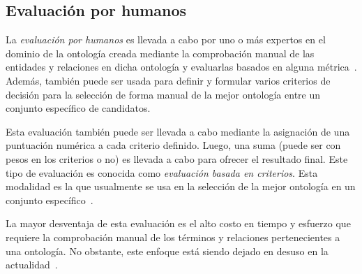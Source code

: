\subsection{Evaluación por humanos}
La \textit{evaluación por humanos} es llevada a cabo por uno o más expertos en el dominio de la ontología creada mediante la comprobación manual de las entidades y relaciones en dicha ontología y evaluarlas basados en alguna métrica~\cite{ref:97}. Además, también puede ser usada para definir y formular varios criterios de decisión para la selección de forma manual de la mejor ontología entre un conjunto específico de candidatos.

Esta evaluación también puede ser llevada a cabo mediante la asignación de una puntuación numérica a cada criterio definido. Luego, una suma (puede ser con pesos en los criterios o no) es llevada a cabo para ofrecer el resultado final. Este tipo de evaluación es conocida como \textit{evaluación basada en criterios}\cite{ref:96}. Esta modalidad es la que usualmente se usa en la selección de la mejor ontología en un conjunto específico~\cite{ref:92}.

La mayor desventaja de esta evaluación es el alto costo en tiempo y esfuerzo que requiere la comprobación manual de los términos y relaciones pertenecientes a una ontología. No obstante, este enfoque está siendo dejado en desuso en la actualidad~\cite{ref:92}.
